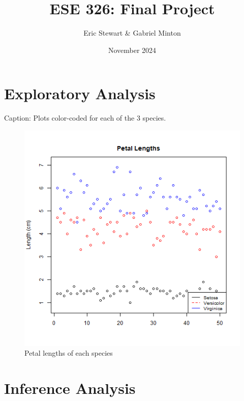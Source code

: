 \documentclass{article}
\title{ESE 326: Final Project}
\author{Eric Stewart \& Gabriel Minton}
\date{November 2024}
\begin{document}
\maketitle

\section{Exploratory Analysis}

\color{Aquamarine}
Caption: Plots color-coded for each of the 3 species.

\begin{figure}[H]
	\centering
	\includegraphics[width=.5\textwidth]{petal_length.png}
	\caption{Petal lengths of each species}
\end{figure}

\section{Inference Analysis}
\end{document}
